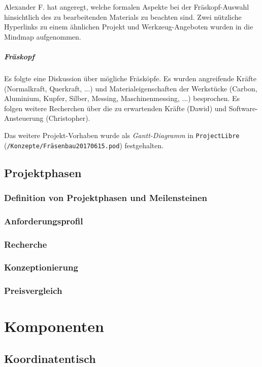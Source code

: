 \documentclass[
	a4paper,
	smallheadings,
	german,
	]
	{scrreprt}
\begin{document}
Alexander F. hat angeregt, welche formalen Aspekte bei der Fräskopf-Auswahl hinsichtlich des zu bearbeitenden Materials zu beachten sind.
Zwei nützliche Hyperlinks zu einem ähnlichen Projekt\autocite{:Herbert} und Werkzeug-Angeboten\autocite{:ZuJeddeloh} wurden in die Mindmap  aufgenommen.

\paragraph{Fräskopf}
Es folgte eine Diskussion über mögliche Fräsköpfe.
Es wurden angreifende Kräfte (Normalkraft, Querkraft, ...) und Materialeigenschaften der Werkstücke (Carbon, Aluminium, Kupfer, Silber, Messing, Maschinenmessing, ...)  besprochen.
Es folgen weitere Recherchen über die zu erwartenden Kräfte (Dawid) und Software-Ansteuerung (Christopher).

Das weitere Projekt-Vorhaben wurde als \textit{Gantt-Diagramm} in \texttt{ProjectLibre} (\texttt{/Konzepte/Fräsenbau20170615.pod}) festgehalten. 


\section{Projektphasen}
\subsection{Definition von Projektphasen und Meilensteinen}
\subsection{Anforderungsprofil}
\subsection{Recherche}
\subsection{Konzeptionierung}
\subsection{Preisvergleich}

\chapter{Komponenten}
\section{Koordinatentisch}
\end{document}
